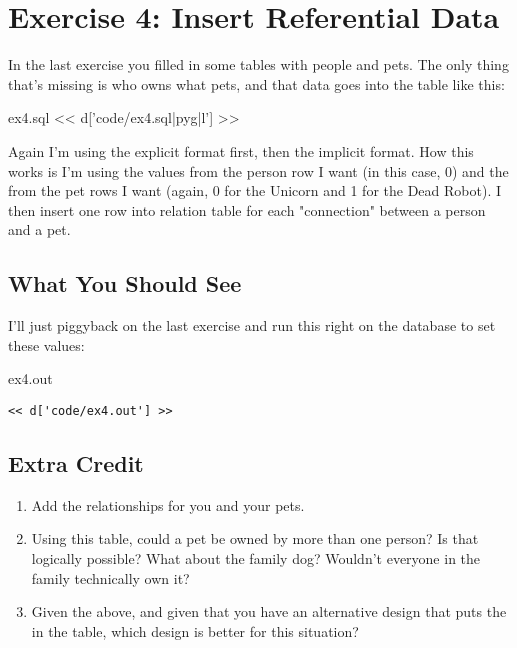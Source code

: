 \chapter{Exercise 4: Insert Referential Data}

In the last exercise you filled in some tables with people and pets.
The only thing that's missing is who owns what pets, and that data 
goes into the  table like this:

\begin{code}{ex4.sql}
<< d['code/ex4.sql|pyg|l'] >>
\end{code}

Again I'm using the explicit format first, then the implicit format.
How this works is I'm using the  values from the person
row I want (in this case, 0) and the  from the pet rows
I want (again, 0 for the Unicorn and 1 for the Dead Robot).  I then
insert one row into  relation table for each 
"connection" between a person and a pet.

\section{What You Should See}

I'll just piggyback on the last exercise and run this right on the
 database to set these values:

\begin{code}{ex4.out}
\begin{Verbatim}
<< d['code/ex4.out'] >>
\end{Verbatim}
\end{code}


\section{Extra Credit}

\begin{enumerate}
\item Add the relationships for you and your pets.
\item Using this table, could a pet be owned by more than one person?  Is that logically possible?  What about the family dog? Wouldn't everyone in the family technically own it?
\item Given the above, and given that you have an alternative design that puts the  in the  table, which design is better for this situation?
\end{enumerate}


